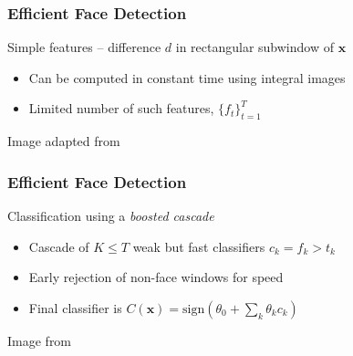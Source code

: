 \documentclass[xetex,professionalfont]{beamer}
\renewcommand{\vec}[1]{\ensuremath{\mathbf{#1}}}
\newcommand{\vx}{\vec{x}}
\begin{document}
\begin{frame}
\frametitle{Efficient Face Detection}

Simple features -- difference $d$ in rectangular subwindow of $\vx$
\begin{itemize}
    \item Can be computed in constant time using integral images
    \item Limited number of such features, $\{f_t\}_{t=1}^T$ %
\end{itemize}

\bigskip
\begin{center}
    {\centering Image adapted from \cite{prince12}}
\end{center}

\end{frame}


\begin{frame}
\frametitle{Efficient Face Detection}

Classification using a \emph{boosted cascade}
\begin{itemize}
    \item Cascade of $K\leq T$ weak but fast classifiers $c_k=f_k>t_k$ %
    \item Early rejection of non-face windows for speed %
    \item Final classifier is $C(\vx)=\text{sign}(\theta_0+\sum_k \theta_k c_k)$ %
\end{itemize}

\medskip
\begin{center}
    {\centering Image from \cite{prince12}}
\end{center}

\end{frame}
\end{document}
